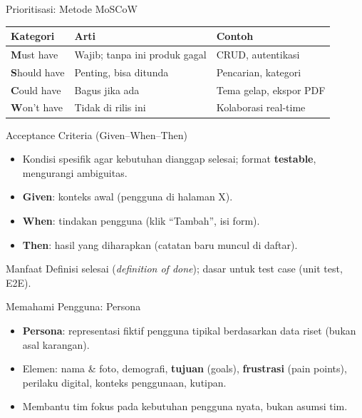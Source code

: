 \documentclass[handout]{beamer}
\begin{document}
\begin{frame}{Prioritisasi: Metode MoSCoW}
	\begin{tabular}{|l|l|l|}
		\hline
		\textbf{Kategori} & \textbf{Arti} & \textbf{Contoh} \\
		\hline
		\textbf{M}ust have & Wajib; tanpa ini produk gagal & CRUD, autentikasi \\
		\hline
		\textbf{S}hould have & Penting, bisa ditunda & Pencarian, kategori \\
		\hline
		\textbf{C}ould have & Bagus jika ada & Tema gelap, ekspor PDF \\
		\hline
		\textbf{W}on't have & Tidak di rilis ini & Kolaborasi real-time \\
		\hline
	\end{tabular}
\end{frame}

\begin{frame}{Acceptance Criteria (Given--When--Then)}
	\begin{itemize}
		\item Kondisi spesifik agar kebutuhan dianggap selesai; format \textbf{testable}, mengurangi ambiguitas.
		\item \textbf{Given}: konteks awal (pengguna di halaman X).
		\item \textbf{When}: tindakan pengguna (klik ``Tambah'', isi form).
		\item \textbf{Then}: hasil yang diharapkan (catatan baru muncul di daftar).
	\end{itemize}
	\begin{block}{Manfaat}
		Definisi selesai (\textit{definition of done}); dasar untuk test case (unit test, E2E).
	\end{block}
\end{frame}

\begin{frame}{Memahami Pengguna: Persona}
	\begin{itemize}
		\item \textbf{Persona}: representasi fiktif pengguna tipikal berdasarkan data riset (bukan asal karangan).
		\item Elemen: nama \& foto, demografi, \textbf{tujuan} (goals), \textbf{frustrasi} (pain points), perilaku digital, konteks penggunaan, kutipan.
		\item Membantu tim fokus pada kebutuhan pengguna nyata, bukan asumsi tim.
	\end{itemize}
\end{frame}
\end{document}
